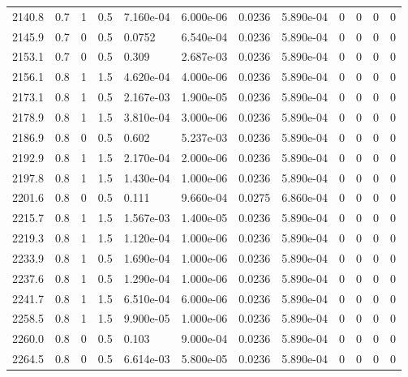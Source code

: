 \documentclass[preview]{standalone}
\begin{document}
{{{{{{{{{{\begin{tabular}{L{1.2cm}C{1.2cm} C{0.3cm}C{0.5cm} C{1.4cm}C{1.4cm} C{1.4cm}C{1.4cm} C{1.6cm}C{1.6cm} C{1.6cm}C{1.6cm}}
  2140.8  &   0.7  & 1     & 0.5 &  7.160e-04  & 6.000e-06  &  0.0236&   5.890e-04& 0 & 0   &  0 & 0  \\ 
  2145.9  &   0.7  & 0     & 0.5 &  0.0752  & 6.540e-04  &  0.0236&   5.890e-04& 0 & 0   &  0 & 0  \\ 
  2153.1  &   0.7  & 0     & 0.5 &  0.309  & 2.687e-03  &  0.0236&   5.890e-04& 0 & 0   &  0 & 0  \\ 
  2156.1  &   0.8  & 1     & 1.5 &  4.620e-04  & 4.000e-06  &  0.0236&   5.890e-04& 0 & 0   &  0 & 0  \\ 
  2173.1  &   0.8  & 1     & 0.5 &  2.167e-03  & 1.900e-05  &  0.0236&   5.890e-04& 0 & 0   &  0 & 0  \\ 
  2178.9  &   0.8  & 1     & 1.5 &  3.810e-04  & 3.000e-06  &  0.0236&   5.890e-04& 0 & 0   &  0 & 0  \\ 
  2186.9  &   0.8  & 0     & 0.5 &  0.602  & 5.237e-03  &  0.0236&   5.890e-04& 0 & 0   &  0 & 0  \\ 
  2192.9  &   0.8  & 1     & 1.5 &  2.170e-04  & 2.000e-06  &  0.0236&   5.890e-04& 0 & 0   &  0 & 0  \\ 
  2197.8  &   0.8  & 1     & 1.5 &  1.430e-04  & 1.000e-06  &  0.0236&   5.890e-04& 0 & 0   &  0 & 0  \\ 
  2201.6  &   0.8  & 0     & 0.5 &  0.111  & 9.660e-04  &  0.0275&   6.860e-04& 0 & 0   &  0 & 0  \\ 
  2215.7  &   0.8  & 1     & 1.5 &  1.567e-03  & 1.400e-05  &  0.0236&   5.890e-04& 0 & 0   &  0 & 0  \\ 
  2219.3  &   0.8  & 1     & 1.5 &  1.120e-04  & 1.000e-06  &  0.0236&   5.890e-04& 0 & 0   &  0 & 0  \\ 
  2233.9  &   0.8  & 1     & 0.5 &  1.690e-04  & 1.000e-06  &  0.0236&   5.890e-04& 0 & 0   &  0 & 0  \\ 
  2237.6  &   0.8  & 1     & 0.5 &  1.290e-04  & 1.000e-06  &  0.0236&   5.890e-04& 0 & 0   &  0 & 0  \\ 
  2241.7  &   0.8  & 1     & 1.5 &  6.510e-04  & 6.000e-06  &  0.0236&   5.890e-04& 0 & 0   &  0 & 0  \\ 
  2258.5  &   0.8  & 1     & 1.5 &  9.900e-05  & 1.000e-06  &  0.0236&   5.890e-04& 0 & 0   &  0 & 0  \\ 
  2260.0  &   0.8  & 0     & 0.5 &  0.103  & 9.000e-04  &  0.0236&   5.890e-04& 0 & 0   &  0 & 0  \\ 
  2264.5  &   0.8  & 0     & 0.5 &  6.614e-03  & 5.800e-05  &  0.0236&   5.890e-04& 0 & 0   &  0 & 0  \\ 

\end{tabular}}}}}}}}}}}
\end{document}

